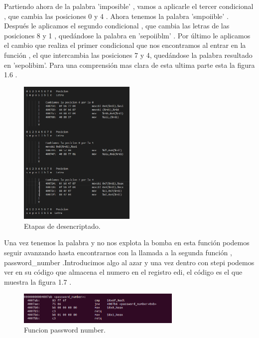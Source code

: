 	Partiendo ahora de la palabra 'imposible' , vamos a aplicarle el tercer condicional , que cambia las posiciones 0 y 4 . Ahora tenemos la palabra 
	'smpoiible' . Después le aplicamos el segundo condicional , que cambia las letras de las posiciones 8 y 1 , quedándose la palabra en 'sepoiiblm' . Por último le aplicamos el cambio que realiza el primer condicional que nos encontramos al entrar en la función , el que intercambia las posiciones 7 y 4, quedándose la palabra resultado en 'sepolibim'. Para una comprensión mas clara de esta ultima parte esta la figura 1.6 . \\
	
	\begin{figure}[htb]
		\centering
		\includegraphics[width=0.5\textwidth]{./imagenes/8}
		\caption{Etapas de desencriptado.} \label{fig:1}
	\end{figure}
	
	Una vez tenemos la palabra y no nos explota la bomba en esta función podemos seguir avanzando hasta encontrarnos con la llamada a la segunda función , password\_number .Introducimos algo al azar y una vez dentro con stepi podemos ver en su código que almacena el numero en el registro edi, el código es el que muestra la figura 1.7 .
	
	\begin{figure}[htb]
		\centering
		\includegraphics[width=0.7\textwidth]{./imagenes/9}
		\caption{Funcion password number.} \label{fig:1}
	\end{figure}
	
